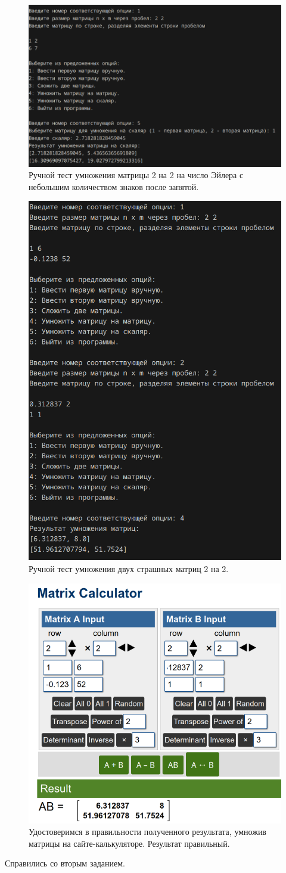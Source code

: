 \begin{figure}[H]
	\centering
	\includegraphics[width=0.58\linewidth]{tests-task6}
	\caption*{Ручной тест умножения матрицы 2 на 2 на число Эйлера с небольшим количеством знаков после запятой.}
	\label{fig:tests-task6}
\end{figure}
\begin{figure}[H]
	\centering
	\includegraphics[width=0.7\linewidth]{tests-task7}
	\caption*{Ручной тест умножения двух страшных матриц 2 на 2.}
	\label{fig:tests-task7}
\end{figure}
\begin{figure}[H]
	\centering
	\includegraphics[width=0.5\linewidth]{tests-task8}
	\caption*{Удостоверимся в правильности полученного результата, умножив матрицы на сайте-калькуляторе. Результат правильный.}
	\label{fig:tests-task8}
\end{figure}
Справились со вторым заданием. \vspace{2cm}

